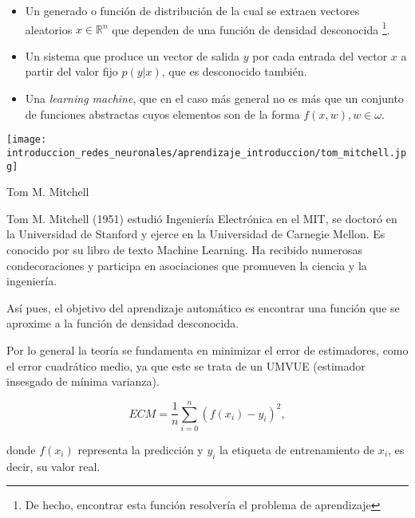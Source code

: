 \begin{itemize}
    \item Un generado o función de distribución de la cual se extraen 
    vectores aleatorios 
    $x \in \mathbb R^ n$ 
    que dependen de una función de densidad desconocida \footnote{De hecho, encontrar esta función resolvería el problema de aprendizaje}.
    
    \item Un sistema que produce un vector de salida $y$ por cada entrada del vector $x$ a partir del valor fijo $p(y|x)$, que es desconocido también. 
    
    \item Una \textit{learning machine}, que en el caso más general no es  más que un conjunto de funciones abstractas cuyos elementos son de la forma $f(x,w), w\in \omega$.
\end{itemize}

\begin{marginfigure}
    \texttt{[image: introduccion\_redes\_neuronales/aprendizaje\_introduccion/tom\_mitchell.jpg]}
   \caption{Tom M. Mitchell}
   \small
    Tom M. Mitchell
     \cite{mitchell-wikipedia} 
    (1951) estudió Ingeniería Electrónica en el MIT, 
    se doctoró en la Universidad de Stanford y ejerce en la Universidad de Carnegie Mellon. Es conocido por su libro 
    de texto Machine Learning. Ha recibido numerosas condecoraciones y 
   participa en asociaciones que promueven la ciencia y la ingeniería.
\end{marginfigure}



Así pues, el objetivo del aprendizaje automático es encontrar una función que se aproxime a la función de densidad desconocida.

Por lo general la teoría se fundamenta en minimizar el error de estimadores, como el error cuadrático medio, ya que este se trata de un UMVUE  (estimador insesgado de mínima varianza). 

$$ECM = \frac{1}{n} \sum_{i=0} ^n (f(x_i) - y_i)^2,$$

donde $f(x_i)$ representa la predicción y $y_i$ la etiqueta de entrenamiento de $x_i$, es decir, su valor real. 

